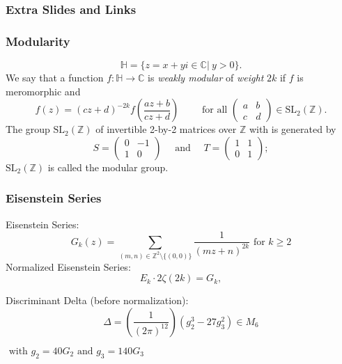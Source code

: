 \begin{frame}
	\frametitle{Extra Slides and Links}
	
	
	
	
	
\end{frame}

\begin{frame}
	\frametitle{Modularity}
	$$\mathbb{H} = \{z = x+yi \in \mathbb{C} | \ y>0 \}.$$
	We say that a function $f:\mathbb{H} \to \mathbb{C}$ is \textit{weakly modular} of \textit{weight} $2k$ if $f$ is meromorphic and
	$$
	f(z) = (cz+d)^{-2k} f \left( \frac{az+b}{cz+d} \right)
	\qquad \text{ for all }
	\begin{pmatrix} a & b\\
	c & d
	\end{pmatrix}
	\in \text{SL}_2(\mathbb{Z}).
	$$
	The group $\text{SL}_2(\mathbb{Z})$ of invertible 2-by-2 matrices over $\mathbb{Z}$ with  is generated by
	$$
	S = \begin{pmatrix} 0 & -1 \\
	1 &  0
	\end{pmatrix}
	\quad \text{ and } \quad
	T = \begin{pmatrix} 1 & 1 \\
	0 & 1 
	\end{pmatrix};
	$$
	$\text{SL}_2(\mathbb{Z})$ is called the modular group.
\end{frame}

\begin{frame}
	\frametitle{Eisenstein Series}
	Eisenstein Series:
	$$
	G_k(z) = \sum_{(m,n) \in \mathbb{Z}^2\setminus\{(0,0)\}} \frac{1}{(mz+n)^{2k}} \text{ for } k \geq 2
	$$
	Normalized Eisenstein Series:
	$$
	E_k \cdot 2\zeta(2k) = G_k,
	$$
	
	Discriminant Delta (before normalization):
	$$
	\varDelta = \left( \frac{1}{(2\pi)^{12}} \right) (g_2^3 - 27g_3^2) \in M_6
	$$
	\begin{flushright}
		$\text{ with } g_2 = 40G_2 \text{ and } g_3 = 140G_3$
	\end{flushright}
\end{frame}

